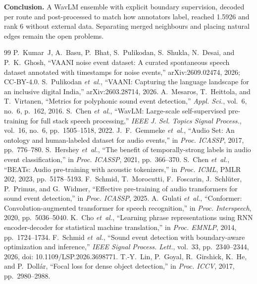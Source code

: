 \documentclass[conference,10pt]{IEEEtran}
\begin{document}
\textbf{Conclusion.} A WavLM ensemble with explicit boundary supervision, decoded per route and post-processed to match how annotators label, reached 1.5926 and rank 6 without external data. Separating merged neighbours and placing natural edges remain the open problems.


\begin{thebibliography}{99}
\footnotesize
{} P.~Kumar~J, A.~Basu, P.~Bhat, S.~Pulikodan, S.~Shukla, N.~Desai, and P.~K.~Ghosh, ``VAANI noise event dataset: A curated spontaneous speech dataset annotated with timestamps for noise events,'' arXiv:2609.02474, 2026; CC-BY-4.0.
 S.~Pulikodan \emph{et~al.}, ``VAANI: Capturing the language landscape for an inclusive digital India,'' arXiv:2603.28714, 2026.
 A.~Mesaros, T.~Heittola, and T.~Virtanen, ``Metrics for polyphonic sound event detection,'' \emph{Appl. Sci.}, vol.~6, no.~6, p.~162, 2016.
 S.~Chen \emph{et~al.}, ``WavLM: Large-scale self-supervised pre-training for full stack speech processing,'' \emph{IEEE J. Sel. Topics Signal Process.}, vol.~16, no.~6, pp.~1505--1518, 2022.
 J.~F.~Gemmeke \emph{et~al.}, ``Audio Set: An ontology and human-labeled dataset for audio events,'' in \emph{Proc. ICASSP}, 2017, pp.~776--780.
 S.~Hershey \emph{et~al.}, ``The benefit of temporally-strong labels in audio event classification,'' in \emph{Proc. ICASSP}, 2021, pp.~366--370.
 S.~Chen \emph{et~al.}, ``BEATs: Audio pre-training with acoustic tokenizers,'' in \emph{Proc. ICML}, PMLR 202, 2023, pp.~5178--5193.
 F.~Schmid, T.~Morocutti, F.~Foscarin, J.~Schl\"uter, P.~Primus, and G.~Widmer, ``Effective pre-training of audio transformers for sound event detection,'' in \emph{Proc. ICASSP}, 2025.
 A.~Gulati \emph{et~al.}, ``Conformer: Convolution-augmented transformer for speech recognition,'' in \emph{Proc. Interspeech}, 2020, pp.~5036--5040.
 K.~Cho \emph{et~al.}, ``Learning phrase representations using RNN encoder-decoder for statistical machine translation,'' in \emph{Proc. EMNLP}, 2014, pp.~1724--1734.
 F.~Schmid \emph{et~al.}, ``Sound event detection with boundary-aware optimization and inference,'' \emph{IEEE Signal Process. Lett.}, vol.~33, pp.~2340--2344, 2026, doi: 10.1109/LSP.2026.3698771.
 T.-Y.~Lin, P.~Goyal, R.~Girshick, K.~He, and P.~Doll\'ar, ``Focal loss for dense object detection,'' in \emph{Proc. ICCV}, 2017, pp.~2980--2988.

\end{thebibliography}
\end{document}
